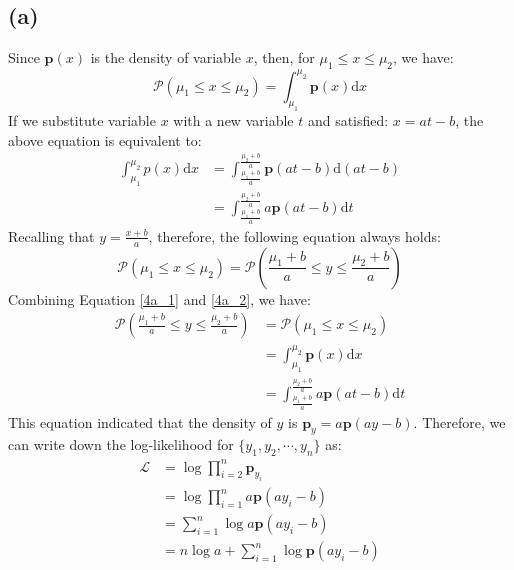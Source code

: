 \documentclass[10pt,a4paper]{article}
\begin{document}
\subsection*{(a)}
Since $\mathbf{p}(x)$ is the density of variable $x$, then, for $\mu_{1} \leq x \leq \mu_{2}$, we have:
\begin{equation*}
	\mathcal{P}(\mu_{1} \leq x \leq \mu_{2}) = \int_{\mu_{1}}^{\mu_{2}}\mathbf{p}(x)\mathrm{d}x
\end{equation*}
If we substitute variable $x$ with a new variable $t$ and satisfied: $x = at - b$, the above equation is equivalent to:
\begin{equation}
	\begin{aligned}
		\int_{\mu_{1}}^{\mu_{2}}p(x)\mathrm{d}x &= \int_{\frac{\mu_{1} + b}{a}}^{\frac{\mu_{2} + b}{a}}\mathbf{p}(at - b)\mathrm{d}(at-b) \\
		&= \int_{\frac{\mu_{1} + b}{a}}^{\frac{\mu_{2} + b}{a}} a \mathbf{p}(at - b) \mathrm{d}t
	\end{aligned}
	\label{4a_1}
\end{equation}
Recalling that $y = \frac{x + b}{a}$, therefore, the following equation always holds:
\begin{equation}
	\mathcal{P}(\mu_{1} \leq x \leq \mu_{2}) = \mathcal{P}(\frac{\mu_{1} + b}{a} \leq y \leq \frac{\mu_{2}+ b}{a})
	\label{4a_2}
\end{equation}
Combining Equation \ref{4a_1} and \ref{4a_2}, we have:
\begin{equation*}
	\begin{aligned}
		\mathcal{P}(\frac{\mu_{1} + b}{a} \leq y \leq \frac{\mu_{2}+ b}{a}) &= \mathcal{P}(\mu_{1} \leq x \leq \mu_{2}) \\
		&= \int_{\mu_{1}}^{\mu_{2}}\mathbf{p}(x)\mathrm{d}x \\
		&= \int_{\frac{\mu_{1} + b}{a}}^{\frac{\mu_{2} + b}{a}} a \mathbf{p}(at - b) \mathrm{d}t
	\end{aligned}
\end{equation*}
This equation indicated that the density of $y$ is $\mathbf{p}_{y} = a \mathbf{p}(ay - b)$. Therefore, we can write down the log-likelihood for $\{ y_{1}, y_{2}, \cdots, y_{n} \}$ as:
\begin{equation*}
	\begin{aligned}
		\mathcal{L} &= \log \displaystyle\prod_{i = 2}^{n}{\mathbf{p}_{y_{i}}} \\
		&= \log \displaystyle\prod_{i = 1}^{n}{a \mathbf{p}(ay_{i} - b)} \\
		&= \displaystyle\sum_{i = 1}^{n}\log{a \mathbf{p}(ay_{i} - b)} \\
		&= n \log{a} + \displaystyle\sum_{i = 1}^{n} \log{\mathbf{p}(a y_{i} - b)}
	\end{aligned}
\end{equation*}
\end{document}
